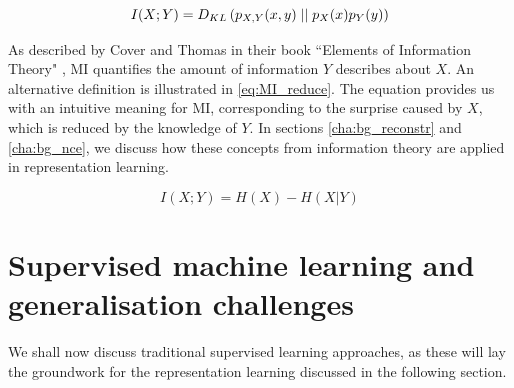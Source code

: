 \begin{equation}
	I(X; Y) =  D_{KL} \left( p_{X, Y}(x, y) \mid \mid p_X(x) p_Y(y) \right)
\end{equation}

As described by Cover and Thomas in their book ``Elements of Information Theory" \citep{coverELEMENTSINFORMATIONTHEORY}, MI quantifies the amount of information $Y$ describes about $X$. An alternative definition is illustrated in \ref{eq:MI_reduce}. The equation provides us with an intuitive meaning for MI, corresponding to the surprise caused by $X$, which is reduced by the knowledge of $Y$. In sections \ref{cha:bg_reconstr} and \ref{cha:bg_nce}, we discuss how these concepts from information theory are applied in representation learning.

\begin{equation}
	I(X;Y)= H(X) - H(X|Y) \label{eq:MI_reduce}
\end{equation}



\section{Supervised machine learning and generalisation challenges}




We shall now discuss traditional supervised learning approaches, as these will lay the groundwork for the representation learning discussed in the following section. 

